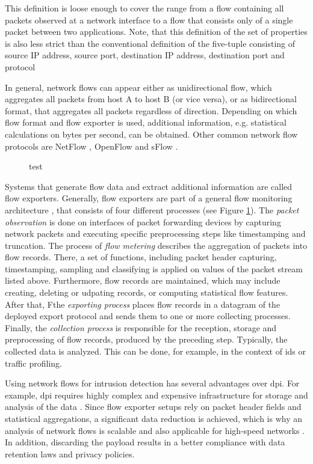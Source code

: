 This definition is loose enough to cover the range from a flow containing all packets observed at a network interface to a flow that consists only of a single packet between two applications. Note, that this definition of the set of properties is also less strict than the conventional definition of the five-tuple consisting of source IP address, source port, destination IP address, destination port and protocol \cite{rfc5101}

In general, network flows can appear either as unidirectional flow, which aggregates all packets from host A to host B (or vice versa), or as bidirectional format, that aggregates all packets regardless of direction. Depending on which flow format and flow exporter is used, additional information, e.g. statistical calculations on bytes per second, can be obtained. Other common network flow protocols are NetFlow \cite{rfc3954}, OpenFlow \cite{mck_2008} and sFlow \cite{pha_2004}.

\begin{figure}[t]
    \centering
    
    \caption{test}
    \label{fig:flow-export}
\end{figure}


Systems that generate flow data and extract additional information are called flow exporters. Generally, flow exporters are part of a general flow monitoring architecture \cite{hof_2014}, that consists of four different processes (see Figure \ref{fig:flow-export}). The \textit{packet observation} is done on interfaces of packet forwarding devices by capturing network packets and executing specific preprocessing steps like timestamping and truncation. The process of \textit{flow metering} describes the aggregation of packets into flow records. There, a set of functions, including packet header capturing, timestamping, sampling and classifying is applied on values of the packet stream listed above. Furthermore, flow records are  maintained, which may include creating, deleting or udpating records, or computing statistical flow features. After that, Fthe \textit{exporting process} places flow records in a datagram of the deployed export protocol and sends them to one or more collecting processes. Finally, the \textit{collection process} is responsible for the reception, storage and preprocessing of flow records, produced by the preceding step. Typically, the collected data is analyzed. This can be done, for example, in the context of \acrshort{ids} or traffic profiling.

Using network flows for intrusion detection has several advantages over \acrshort{dpi}. For example, \acrshort{dpi} requires highly complex and expensive infrastructure for storage and analysis of the data \cite{hof_2014}. Since flow exporter setups rely on packet header fields and statistical aggregations, a significant data reduction is achieved, which is why an analysis of network flows is scalable and also applicable for high-speed networks \cite{hof_2014}. In addition, discarding the payload results in a better compliance with data retention laws and privacy policies.